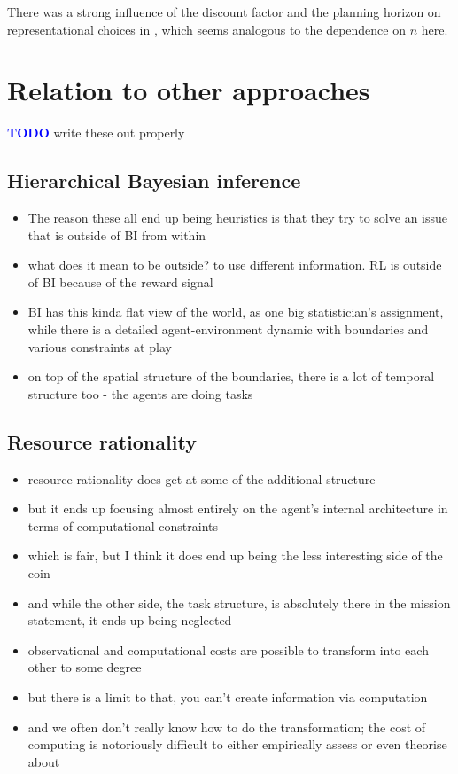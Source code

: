 \documentclass{article}
\newcommand{\todo}{\textcolor{blue}{\textbf{TODO }}}
\begin{document}
There was a strong influence of the discount factor and the planning horizon on representational choices in \cite{shen2023meta}, which seems analogous to the dependence on $n$ here.

\section{Relation to other approaches} \label{sec:others}

\todo write these out properly

\subsection{Hierarchical Bayesian inference}

\begin{itemize}
    \item The reason these all end up being heuristics is that they try to solve an issue that is outside of BI from within
    \item what does it mean to be outside? to use different information. RL is outside of BI because of the reward signal
    \item BI has this kinda flat view of the world, as one big statistician’s assignment, while there is a detailed agent-environment dynamic with boundaries and various constraints at play
    \item on top of the spatial structure of the boundaries, there is a lot of temporal structure too - the agents are doing tasks
\end{itemize}

\subsection{Resource rationality}

\begin{itemize}
    \item resource rationality does get at some of the additional structure
    \item  but it ends up focusing almost entirely on the agent’s internal architecture in terms of computational constraints
    \item which is fair, but I think it does end up being the less interesting side of the coin
    \item and while the other side, the task structure, is absolutely there in the mission statement, it ends up being neglected
    \item observational and computational costs are possible to transform into each other to some degree
    \item but there is a limit to that, you can't create information via computation
    \item and we often don't really know how to do the transformation; the cost of computing is notoriously difficult to either empirically assess or even theorise about
\end{itemize}
\end{document}
